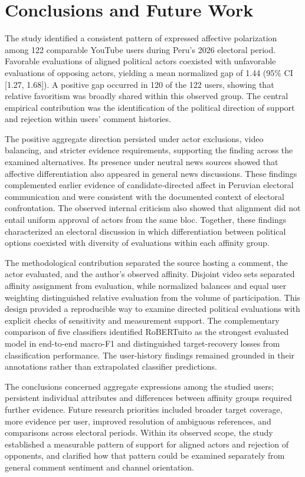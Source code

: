 \documentclass[conference,letterpaper]{IEEEtran}
\begin{document}
\section{Conclusions and Future Work}
The study identified a consistent pattern of expressed affective polarization among 122 comparable YouTube users during Peru's 2026 electoral period. Favorable evaluations of aligned political actors coexisted with unfavorable evaluations of opposing actors, yielding a mean normalized gap of 1.44 (95\% CI [1.27, 1.68]). A positive gap occurred in 120 of the 122 users, showing that relative favoritism was broadly shared within this observed group. The central empirical contribution was the identification of the political direction of support and rejection within users' comment histories.

The positive aggregate direction persisted under actor exclusions, video balancing, and stricter evidence requirements, supporting the finding across the examined alternatives. Its presence under neutral news sources showed that affective differentiation also appeared in general news discussions. These findings complemented earlier evidence of candidate-directed affect in Peruvian electoral communication and were consistent with the documented context of electoral confrontation. The observed internal criticism also showed that alignment did not entail uniform approval of actors from the same bloc. Together, these findings characterized an electoral discussion in which differentiation between political options coexisted with diversity of evaluations within each affinity group.

The methodological contribution separated the source hosting a comment, the actor evaluated, and the author's observed affinity. Disjoint video sets separated affinity assignment from evaluation, while normalized balances and equal user weighting distinguished relative evaluation from the volume of participation. This design provided a reproducible way to examine directed political evaluations with explicit checks of sensitivity and measurement support. The complementary comparison of five classifiers identified RoBERTuito as the strongest evaluated model in end-to-end macro-F1 and distinguished target-recovery losses from classification performance. The user-history findings remained grounded in their annotations rather than extrapolated classifier predictions.

The conclusions concerned aggregate expressions among the studied users; persistent individual attributes and differences between affinity groups required further evidence. Future research priorities included broader target coverage, more evidence per user, improved resolution of ambiguous references, and comparisons across electoral periods. Within its observed scope, the study established a measurable pattern of support for aligned actors and rejection of opponents, and clarified how that pattern could be examined separately from general comment sentiment and channel orientation.
\end{document}
